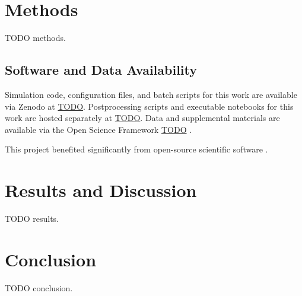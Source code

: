 

\section{Methods} \label{sec:methods}

TODO methods.

\subsection{Software and Data Availability} \label{sec:materials}

Simulation code, configuration files, and batch scripts for this work are available via Zenodo at \url{TODO}.
Postprocessing scripts and executable notebooks for this work are hosted separately at \url{TODO}.
Data and supplemental materials are available via the Open Science Framework \url{TODO} \cite{foster2017open}.

This project benefited significantly from open-source scientific software \cite{2020SciPy-NMeth,harris2020array,reback2020pandas,mckinney-proc-scipy-2010,waskom2021seaborn,hunter2007matplotlib,moreno2023teeplot}.

\section{Results and Discussion} \label{sec:results}

TODO results.

\section{Conclusion} \label{sec:conclusion}

TODO conclusion.

